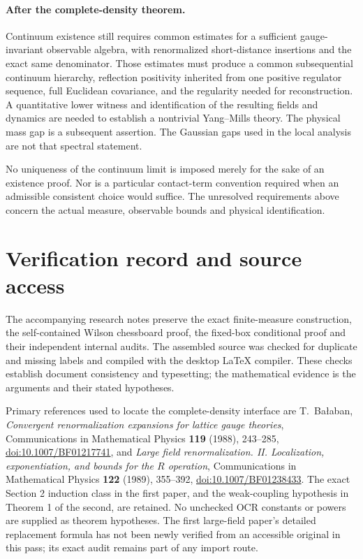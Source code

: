 \documentclass[11pt]{article}
\theoremstyle{remark}
\begin{document}
\paragraph{After the complete-density theorem.}
Continuum existence still requires common estimates for a
sufficient gauge-invariant observable algebra, with renormalized
short-distance insertions and the exact same denominator. Those
estimates must produce a common subsequential continuum hierarchy,
reflection positivity inherited from one positive regulator
sequence, full Euclidean covariance, and the regularity needed
for reconstruction. A quantitative lower witness and
identification of the resulting fields and dynamics are needed
to establish a nontrivial Yang--Mills theory. The physical mass
gap is a subsequent assertion. The Gaussian gaps used in the
local analysis are not that spectral statement.

No uniqueness of the continuum limit is imposed merely for the
sake of an existence proof. Nor is a particular contact-term
convention required when an admissible consistent choice would
suffice. The unresolved requirements above concern the actual
measure, observable bounds and physical identification.

\section*{Verification record and source access}

The accompanying research notes preserve the exact finite-measure
construction, the self-contained Wilson chessboard proof, the
fixed-box conditional proof and their independent internal audits.
The assembled source was checked for duplicate and missing labels
and compiled with the desktop LaTeX compiler. These checks establish
document consistency and typesetting; the mathematical evidence is
the arguments and their stated hypotheses.

Primary references used to locate the complete-density interface are
T.~Ba{\l}aban, \emph{Convergent renormalization expansions for lattice
gauge theories}, Communications in Mathematical Physics
\textbf{119} (1988), 243--285,
\href{https://doi.org/10.1007/BF01217741}{doi:10.1007/BF01217741},
and \emph{Large field renormalization. II. Localization,
exponentiation, and bounds for the \(R\) operation},
Communications in Mathematical Physics \textbf{122} (1989),
355--392,
\href{https://doi.org/10.1007/BF01238433}{doi:10.1007/BF01238433}.
The exact Section 2 induction class in the first paper, and the
weak-coupling hypothesis in Theorem 1 of the second, are retained.
No unchecked OCR constants or powers are supplied as theorem
hypotheses. The first large-field paper's detailed replacement
formula has not been newly verified from an accessible original
in this pass; its exact audit remains part of any import route.
\end{document}
